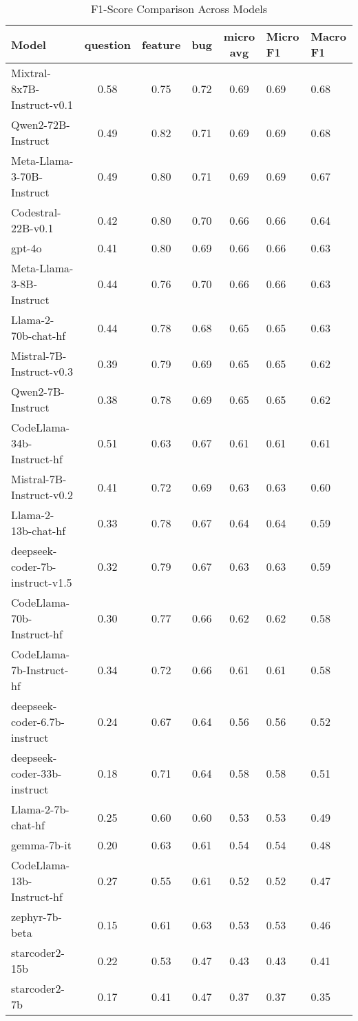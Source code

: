 \begin{table}[ht!]
\centering
\caption{F1-Score Comparison Across Models}
\begin{tabular}{lcccc}
\hline
Model & question & feature & bug & micro avg & Micro F1 & Macro F1 \\
\hline
Mixtral-8x7B-Instruct-v0.1 & 0.58 & 0.75 & 0.72 & 0.69 & 0.69 & 0.68 \\
Qwen2-72B-Instruct & 0.49 & 0.82 & 0.71 & 0.69 & 0.69 & 0.68 \\
Meta-Llama-3-70B-Instruct & 0.49 & 0.80 & 0.71 & 0.69 & 0.69 & 0.67 \\
Codestral-22B-v0.1 & 0.42 & 0.80 & 0.70 & 0.66 & 0.66 & 0.64 \\
gpt-4o & 0.41 & 0.80 & 0.69 & 0.66 & 0.66 & 0.63 \\
Meta-Llama-3-8B-Instruct & 0.44 & 0.76 & 0.70 & 0.66 & 0.66 & 0.63 \\
Llama-2-70b-chat-hf & 0.44 & 0.78 & 0.68 & 0.65 & 0.65 & 0.63 \\
Mistral-7B-Instruct-v0.3 & 0.39 & 0.79 & 0.69 & 0.65 & 0.65 & 0.62 \\
Qwen2-7B-Instruct & 0.38 & 0.78 & 0.69 & 0.65 & 0.65 & 0.62 \\
CodeLlama-34b-Instruct-hf & 0.51 & 0.63 & 0.67 & 0.61 & 0.61 & 0.61 \\
Mistral-7B-Instruct-v0.2 & 0.41 & 0.72 & 0.69 & 0.63 & 0.63 & 0.60 \\
Llama-2-13b-chat-hf & 0.33 & 0.78 & 0.67 & 0.64 & 0.64 & 0.59 \\
deepseek-coder-7b-instruct-v1.5 & 0.32 & 0.79 & 0.67 & 0.63 & 0.63 & 0.59 \\
CodeLlama-70b-Instruct-hf & 0.30 & 0.77 & 0.66 & 0.62 & 0.62 & 0.58 \\
CodeLlama-7b-Instruct-hf & 0.34 & 0.72 & 0.66 & 0.61 & 0.61 & 0.58 \\
deepseek-coder-6.7b-instruct & 0.24 & 0.67 & 0.64 & 0.56 & 0.56 & 0.52 \\
deepseek-coder-33b-instruct & 0.18 & 0.71 & 0.64 & 0.58 & 0.58 & 0.51 \\
Llama-2-7b-chat-hf & 0.25 & 0.60 & 0.60 & 0.53 & 0.53 & 0.49 \\
gemma-7b-it & 0.20 & 0.63 & 0.61 & 0.54 & 0.54 & 0.48 \\
CodeLlama-13b-Instruct-hf & 0.27 & 0.55 & 0.61 & 0.52 & 0.52 & 0.47 \\
zephyr-7b-beta & 0.15 & 0.61 & 0.63 & 0.53 & 0.53 & 0.46 \\
starcoder2-15b & 0.22 & 0.53 & 0.47 & 0.43 & 0.43 & 0.41 \\
starcoder2-7b & 0.17 & 0.41 & 0.47 & 0.37 & 0.37 & 0.35 \\
\hline
\end{tabular}
\end{table}
